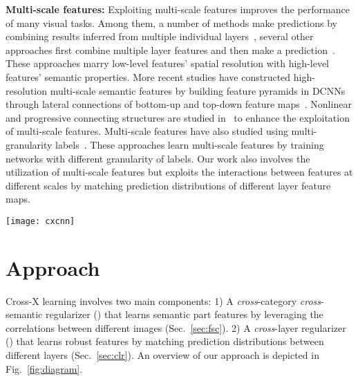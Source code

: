 \documentclass[10pt,twocolumn,letterpaper]{article}
\begin{document}
\textbf{Multi-scale features:} Exploiting multi-scale features improves the performance of many visual tasks. Among them, a number of methods make predictions by combining results inferred from multiple individual layers~\cite{ssd16szegedy,mscnn16cai}, several other approaches first combine multiple layer features and then make a prediction~\cite{fcn15darrell,hypercolumn15girshick,hypernet16kong}. These approaches marry low-level features' spatial resolution with high-level features' semantic properties. More recent studies have constructed high-resolution multi-scale semantic features by building feature pyramids in DCNNs through lateral connections of bottom-up and top-down feature maps~\cite{fpn17kaiming}. Nonlinear and progressive connecting structures are studied in~\cite{dla@darrell} to enhance the exploitation of multi-scale features. Multi-scale features have also studied using multi-granularity labels~\cite{hyperlabels@cvpr,multigranularity@iccv}. These approaches learn multi-scale features by training networks with different granularity of labels. Our work also involves the utilization of multi-scale features but exploits the interactions between features at different scales by matching prediction distributions of different layer feature maps.





\begin{figure*}[t]
\begin{center}
\texttt{[image: cxcnn]}
\end{center}
\caption{Overview of our approach. Our network outputs multiple feature maps by employing the OSME block. Two OSME blocks, each with two excitations, are depicted in the last two stages to illustrate our approach. Feature maps from stage  (blue) and  (red) are combined to generate the merged feature maps (orange). Top-left corner is a zoomed in display of the merging process of the merged feature maps. Feature maps are then aggregated to obtain the corresponding pooling features through GAP or GMP. The pooled features from the same stage are mutually constrained by the  regularizer and are simultaneously concatenated to feed into a fully-connected layer to generate logits. The logits are constrained through the  regularizer after conversion into class probabilities and are combined for classification. Best viewed in color.}
\label{fig:diagram}
\end{figure*}

\section{Approach}
\label{sec:models}
Cross-X learning involves two main components: 
1) A \textit{cross}-category \textit{cross}-semantic regularizer () that learns semantic part features by leveraging the correlations between different images (Sec.~\ref{sec:fsc}).
2) A \textit{cross}-layer regularizer () that learns robust  features by matching prediction distributions between different layers (Sec.~\ref{sec:clr}).
An overview of our approach is depicted in Fig.~\ref{fig:diagram}.
\end{document}
